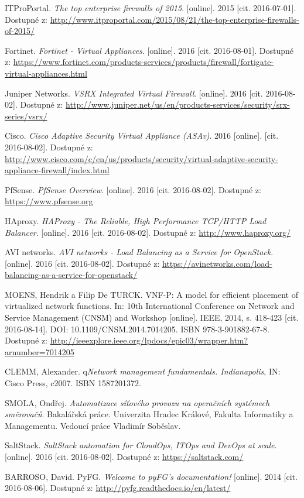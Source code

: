 \begin{thebibliography}{10}
 ITProPortal. \emph{The top enterprise firewalls of 2015}. [online]. 2015 [cit. 2016-07-01]. Dostupné z: \url{http://www.itproportal.com/2015/08/21/the-top-enterprise-firewalls-of-2015/}

Fortinet. \emph{Fortinet - Virtual Appliances}. [online]. 2016 [cit. 2016-08-01]. Dostupné z: \url{https://www.fortinet.com/products-services/products/firewall/fortigate-virtual-appliances.html}

Juniper Networks. \emph{VSRX Integrated Virtual Firewall}.  [online]. 2016 [cit. 2016-08-02]. Dostupné z: \url{http://www.juniper.net/us/en/products-services/security/srx-series/vsrx/}

 Cisco. \emph{Cisco Adaptive Security Virtual Appliance (ASAv)}. 2016 [online]. [cit. 2016-08-02]. Dostupné z: \url{http://www.cisco.com/c/en/us/products/security/virtual-adaptive-security-appliance-firewall/index.html}

 PfSense. \emph{PfSense Overview}. [online]. 2016 [cit. 2016-08-02]. Dostupné z: \url{https://www.pfsense.org}

 HAproxy. \emph{HAProxy - The Reliable, High Performance TCP/HTTP Load Balancer}. [online]. 2016 [cit. 2016-08-02]. Dostupné z: \url{http://www.haproxy.org/}

 AVI networks. \emph{AVI networks - Load Balancing as a Service for OpenStack}. [online]. 2016 [cit. 2016-08-02]. Dostupné z: \url{https://avinetworks.com/load-balancing-as-a-service-for-openstack/}

MOENS, Hendrik a Filip De TURCK. VNF-P: A model for efficient placement of virtualized network functions. In: 10th International Conference on Network and Service Management (CNSM) and Workshop [online]. IEEE, 2014, s. 418-423 [cit. 2016-08-14]. DOI: 10.1109/CNSM.2014.7014205. ISBN 978-3-901882-67-8. Dostupné z: \url{http://ieeexplore.ieee.org/lpdocs/epic03/wrapper.htm?arnumber=7014205}

 CLEMM, Alexander. q\emph{Network management fundamentals. Indianapolis}, IN: Cisco Press, c2007. ISBN 1587201372.

 SMOLA, Ondřej. \emph{Automatizace síťového provozu na operačních systémech směrovačů}. Bakalářská práce. Univerzita Hradec Králové, Fakulta Informatiky a Managementu. Vedoucí práce Vladimír Soběslav. 

 SaltStack. \emph{SaltStack automation for CloudOps, ITOps and DevOps at scale}. [online]. 2016 [cit. 2016-08-02]. Dostupné z: \url{https://saltstack.com/}

 BARROSO, David. PyFG. \emph{Welcome to pyFG’s documentation!} [online]. 2014 [cit. 2016-08-06]. Dostupné z: \url{http://pyfg.readthedocs.io/en/latest/}

\end{thebibliography}